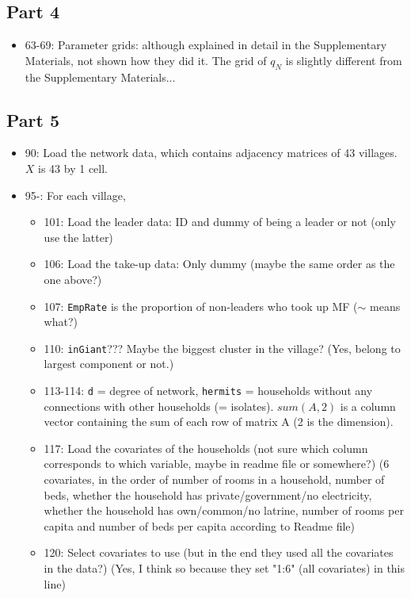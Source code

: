 \documentclass[10pt,letterpaper]{article}
\begin{document}
\subsection*{Part 4}
\begin{itemize}
  \item 63-69: Parameter grids: although explained in detail in the Supplementary Materials, not shown how they did it. The grid of $q_N$ is slightly different from the Supplementary Materials...
\end{itemize}

\subsection*{Part 5}
\begin{itemize}
  \item 90: Load the network data, which contains adjacency matrices of 43 villages. $X$ is 43 by 1 cell.
  \item 95-: For each village,
    \begin{itemize}
      \item 101: Load the leader data: ID and dummy of being a leader or not (only use the latter)
      \item 106: Load the take-up data: Only dummy (maybe the same order as the one above?)
      \item 107: \texttt{EmpRate} is the proportion of non-leaders who took up MF ($\sim$ means what?)
      \item 110: \texttt{inGiant}??? 
        Maybe the biggest cluster in the village? (Yes, belong to largest component or not.)
      \item 113-114: \texttt{d} = degree of network, \texttt{hermits} = households without any connections with other households (= isolates). $sum(A,2)$ is a column vector containing the sum of each row of matrix A (2 is the dimension).
      \item 117: Load the covariates of the households (not sure which column corresponds to which variable, maybe in readme file or somewhere?) (6 covariates, in the order of number of rooms in a household, number of beds, whether the household has private/government/no electricity, whether the household has own/common/no latrine, number of rooms per capita and number of beds per capita according to Readme file)
      \item 120: Select covariates to use (but in the end they used all the covariates in the data?) (Yes, I think so because they set "1:6" (all covariates) in this line)

\end{itemize}
\end{itemize}
\end{document}
